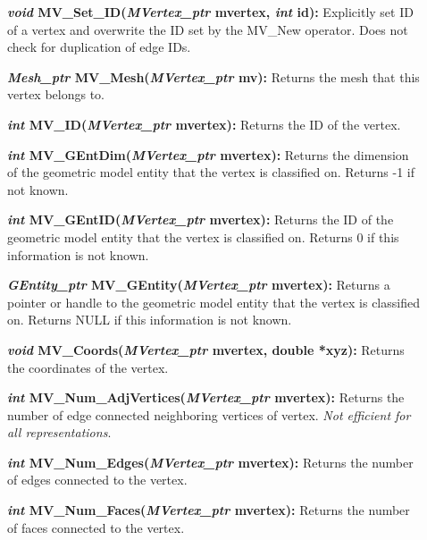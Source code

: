 \documentclass[12pt]{article}
\begin{document}
\begin{description}
\item[]\textbf{\textit{void} MV\_Set\_ID(\textit{MVertex\_ptr} mvertex,
\textit{int} id):} Explicitly set ID of a vertex and overwrite the ID
set by the MV\_New operator. Does not check for duplication of edge
IDs.

\item[]

\item[]\textbf{\textit{Mesh\_ptr} MV\_Mesh(\textit{MVertex\_ptr} mv):}
Returns the mesh that this vertex belongs to.

\item[]\textbf{\textit{int} MV\_ID(\textit{MVertex\_ptr} mvertex):} Returns
the ID of the vertex. 

\item[]\textbf{\textit{int} MV\_GEntDim(\textit{MVertex\_ptr} mvertex):}
Returns the dimension of the geometric model entity that the vertex is
classified on. Returns -1 if not known.

\item[]\textbf{\textit{int} MV\_GEntID(\textit{MVertex\_ptr} mvertex):}
Returns the ID of the geometric model entity that the vertex is
classified on. Returns 0 if this information is not known.

\item[]\textbf{\textit{GEntity\_ptr} MV\_GEntity(\textit{MVertex\_ptr}
  mvertex):} Returns a pointer or handle to the geometric model entity
  that the vertex is classified on. Returns NULL if this information
  is not known.

\item[]\textbf{\textit{void} MV\_Coords(\textit{MVertex\_ptr} mvertex,
double *xyz):} Returns the coordinates of the vertex.

\item[]

\item[]\textbf{\textit{int} MV\_Num\_AdjVertices(\textit{MVertex\_ptr}
mvertex):} Returns the number of edge connected neighboring vertices of
vertex. \textit{Not efficient for all representations}.

\item[]\textbf{\textit{int} MV\_Num\_Edges(\textit{MVertex\_ptr} mvertex):}
Returns the number of edges connected to the vertex.

\item[]\textbf{\textit{int} MV\_Num\_Faces(\textit{MVertex\_ptr} mvertex):}
Returns the number of faces connected to the vertex.


\end{description}
\end{document}
